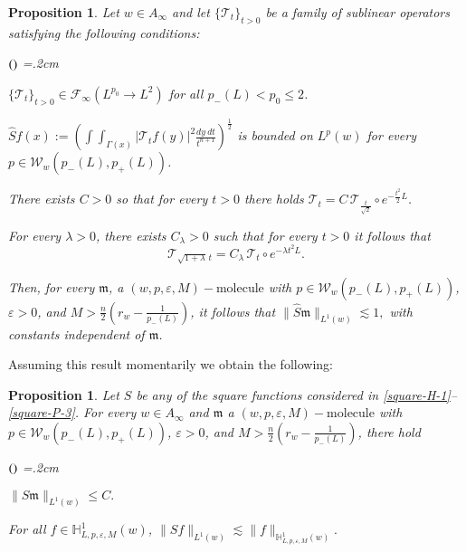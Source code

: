 \documentclass[11pt, a4paper,leqno]{amsart}
\newcommand{\mm}{\mathfrak{m}}
\theoremstyle{plain}
\newtheorem{proposition}[equation]{Proposition}
\theoremstyle{definition}
\theoremstyle{remark}
\numberwithin{equation}{section}
\def \mol{ (w,p,\varepsilon,M)-\textrm{molecule}}
\def \iint{\int\!\!\!\int}
\begin{document}
\begin{proposition}\label{prop:acotacion-T}
Let $w\in A_{\infty}$ and let $\{\mathcal{T}_t\}_{t>0}$ be a family of sublinear operators satisfying the following conditions:

\begin{list}{$(\theenumi)$}{\leftmargin=1cm \itemsep=0.2cm\topsep=.2cm \renewcommand{\theenumi}{\alph{enumi}}}

\item $\{\mathcal{T}_t\}_{t>0}\in \mathcal{F}_{\infty}(L^{p_0}\rightarrow L^2)$ for all $p_-(L)<p_0\leq 2$.

\item $\widehat{S}f(x):=\left(\iint_{\Gamma(x)}|\mathcal{T}_tf(y)|^2\frac{dy \ dt}{t^{n+1}}\right)^{\frac{1}{2}}$ is bounded on $L^p(w)$ for every $p\in \mathcal{W}_w(p_-(L),p_+(L))$.

\item There exists $C>0$ so that for every $t>0$ there holds $\mathcal{T}_{t}=C\,\mathcal{T}_{\frac{t}{\sqrt{2}}}\circ e^{-\frac{t^2}{2}L}$.

\item For every $\lambda>0$, there exists $C_\lambda>0$ such that for every $t>0$ it follows that
$$
\mathcal{T}_{\sqrt{1+\lambda}\,t}=C_\lambda\,\mathcal{T}_{t}\circ e^{-\lambda t^2L}.
$$
\end{list}
Then, for every $\mm$, a $\mol$ with $p\in \mathcal{W}_w(p_-(L),p_+(L))$, $\varepsilon>0$, and $M>\frac{n}{2}\left(r_w-\frac{1}{p_-(L)}\right)$, it follows that $
\|\widehat{S}\mm\|_{L^1(w)}\lesssim 1,
$
with constants independent of $\mm$.
\end{proposition}
%
Assuming this result momentarily we obtain the following:
%
\begin{proposition}\label{prop:contro-mol-SF}
Let $S$ be any of the square functions considered in \eqref{square-H-1}--\eqref{square-P-3}. For every $w\in A_{\infty}$ and $\mm$ a $\mol$ with $p\in \mathcal{W}_w(p_-(L),p_+(L))$, $\varepsilon>0$, and  $M>\frac{n}{2}\left(r_w-\frac{1}{p_-(L)}\right)$, there hold
\begin{list}{$(\theenumi)$}{\leftmargin=1cm \itemsep=0.2cm\topsep=.2cm \renewcommand{\theenumi}{\alph{enumi}}}
\item$
\|S \mm\|_{L^1(w)}\leq C.
$

\item For all $f\in \mathbb{H}_{L,p,\varepsilon,M}^1(w)$, 
$
\|S f\|_{L^1(w)}\lesssim \|f\|_{\mathbb{H}_{L,p,\varepsilon,M}^1(w)}.
$
\end{list}
\end{proposition}
\end{document}
